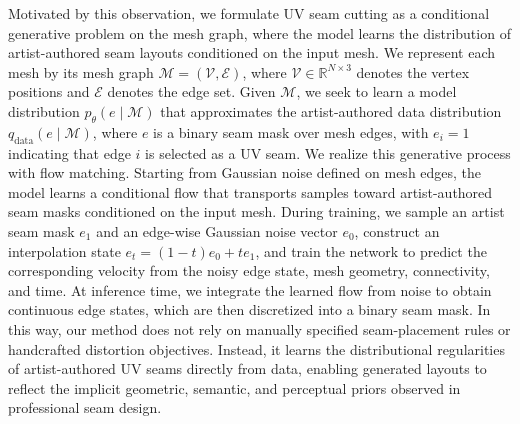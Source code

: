 Motivated by this observation, we formulate UV seam cutting as a conditional generative problem on the mesh graph, where the model learns the distribution of artist-authored seam layouts conditioned on the input mesh.
We represent each mesh by its mesh graph $\mathcal{M}=(\mathcal{V},\mathcal{E})$, where $\mathcal{V}\in\mathbb{R}^{N\times3}$ denotes the vertex positions and $\mathcal{E}$ denotes the edge set.
Given $\mathcal{M}$, we seek to learn a model distribution $p_\theta(e \mid \mathcal{M})$ that approximates the artist-authored data distribution $q_{\mathrm{data}}(e \mid \mathcal{M})$, where $e$ is a binary seam mask over mesh edges, with $e_i = 1$ indicating that edge $i$ is selected as a UV seam.
We realize this generative process with flow matching.
Starting from Gaussian noise defined on mesh edges, the model learns a conditional flow that transports samples toward artist-authored seam masks conditioned on the input mesh. 
During training, we sample an artist seam mask $e_1$ and an edge-wise Gaussian noise vector $e_0$, construct an interpolation state $e_t=(1-t)e_0+t e_1$, and train the network to predict the corresponding velocity from the noisy edge state, mesh geometry, connectivity, and time. 
At inference time, we integrate the learned flow from noise to obtain continuous edge states, which are then discretized into a binary seam mask.
In this way, our method does not rely on manually specified seam-placement rules or handcrafted distortion objectives. 
Instead, it learns the distributional regularities of artist-authored UV seams directly from data, enabling generated layouts to reflect the implicit geometric, semantic, and perceptual priors observed in professional seam design.


